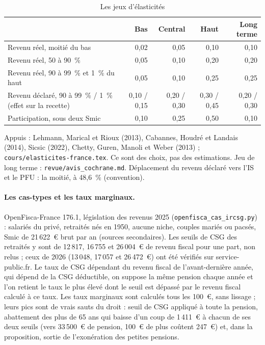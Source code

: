 \begin{table}[!htbp]\centering\scriptsize\setlength{\tabcolsep}{4pt}
\caption{Les jeux d'élasticités}\label{tab:ircsg_jeux}
\begin{tabular}{@{}lrrrr@{}}
\toprule
& Bas & Central & Haut & Long terme \\
\midrule
Revenu réel, moitié du bas & 0,02 & 0,05 & 0,10 & 0,10 \\
Revenu réel, 50 à 90~\% & 0,05 & 0,10 & 0,20 & 0,20 \\
Revenu réel, 90 à 99~\% et 1~\% du haut & 0,05 & 0,10 & 0,25 & 0,25 \\
Revenu déclaré, 90 à 99~\% / 1~\% (effet sur la recette) & 0,10 / 0,15 & 0,20 / 0,30 & 0,30 / 0,45 & 0,20 / 0,30 \\
Participation, sous deux Smic & 0,10 & 0,25 & 0,50 & 0,10 \\
\bottomrule
\end{tabular}
\par\vspace{3pt}\parbox{\linewidth}{\raggedright\scriptsize\color{encre}
Appuis : Lehmann, Marical et Rioux (2013), Cabannes, Houdré et Landais (2014), Sicsic (2022), Chetty, Guren, Manoli et
Weber (2013) ; \texttt{cours/elasticites-france.tex}. Ce sont des choix, pas des estimations. Jeu de long terme :
\texttt{revue/avis\_cochrane.md}. Déplacement du revenu déclaré vers l'IS et le PFU : la moitié, à 48,6~\%
(convention).}
\end{table}

\paragraph{Les cas-types et les taux marginaux.} OpenFisca-France 176.1, législation des revenus 2025
(\texttt{openfisca\_cas\_ircsg.py}) : salariés du privé, retraités nés en 1950, aucune niche, couples mariés ou pacsés,
Smic de 21\,622~€ brut par an (sources secondaires). Les seuils de CSG des retraités y sont de 12\,817, 16\,755 et
26\,004~€ de revenu fiscal pour une part, non relus ; ceux de 2026 (13\,048, 17\,057 et 26\,472~€) ont été vérifiés sur
service-public.fr. Le taux de CSG dépendant du revenu fiscal de l'avant-dernière année, qui dépend de la CSG déductible,
on suppose la même pension chaque année et l'on retient le taux le plus élevé dont le seuil est dépassé par le revenu
fiscal calculé à ce taux. Les taux marginaux sont calculés tous les 100~€, sans lissage ; leurs pics sont de vrais sauts
du droit : seuil de CSG appliqué à toute la pension, abattement des plus de 65 ans qui baisse d'un coup de 1\,411~€ à
chacun de ses deux seuils (vers 33\,500~€ de pension, 100~€ de plus coûtent 247~€) et, dans la proposition, sortie de
l'exonération des petites pensions.

